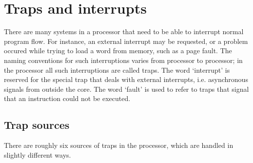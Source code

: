 
\clearpage
\section{Traps and interrupts}
\label{sec:core-ug-traps}

There are many systems in a processor that need to be able to interrupt normal
program flow. For instance, an external interrupt may be requested, or a problem
occured while trying to load a word from memory, such as a page fault. The
naming conventions for such interruptions varies from processor to processor; in
the \rvex{} processor all such interruptions are called traps. The word
`interrupt' is reserved for the special trap that deals with external
interrupts, i.e. asynchronous signals from outside the core. The word `fault' is
used to refer to traps that signal that an instruction could not be executed.

\subsection{Trap sources}
\label{sec:core-ug-traps-sources}

There are roughly six sources of traps in the \rvex{} processor, which are
handled in slightly different ways.

